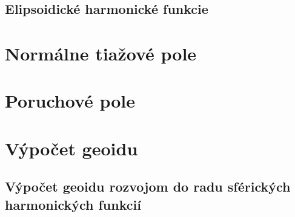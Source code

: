 \documentclass[a4paper, 12pt]{book}
\begin{document}
\section{Elipsoidické harmonické funkcie}








\chapter{Normálne tiažové pole}








\chapter{Poruchové pole}








\chapter{Výpočet geoidu}







\section{Výpočet geoidu rozvojom do radu sférických harmonických funkcií}
\end{document}
